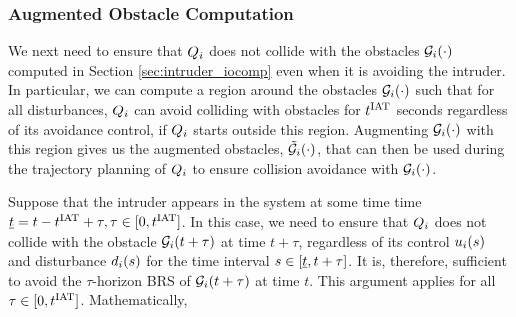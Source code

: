 %
%

\subsubsection{Augmented Obstacle Computation} \label{sec:intruder_aocomp}
We next need to ensure that $Q_i$ does not collide with the obstacles $\mathcal{G}_i(\cdot)$ computed in Section \ref{sec:intruder_iocomp} even when it is avoiding the intruder. In particular, we can compute a region around the obstacles $\mathcal{G}_i(\cdot)$ such that for all disturbances, $Q_i$ can avoid colliding with obstacles for $t^\text{IAT}$ seconds regardless of its avoidance control, if $Q_i$ starts outside this region. Augmenting $\mathcal{G}_i(\cdot)$ with this region gives us the augmented obstacles, $\tilde{\mathcal{G}}_i(\cdot)$, that can then be used during the trajectory planning of $Q_i$ to ensure collision avoidance with $\mathcal{G}_i(\cdot)$.  

Suppose that the intruder appears in the system at some time time $\underline{t} = t - t^\text{IAT} + \tau, \tau \in [0, t^\text{IAT}]$. In this case, we need to ensure that $Q_i$ does not collide with the obstacle $\mathcal{G}_i(t + \tau)$ at time $t + \tau$, regardless of its control $u_i(s)$ and disturbance $d_i(s)$ for the time interval $s \in [\underline{t}, t + \tau]$. It is, therefore, sufficient to avoid the $\tau$-horizon BRS of $\mathcal{G}_i(t + \tau)$ at time $t$. This argument applies for all $\tau \in [0, t^\text{IAT}]$. Mathematically,

